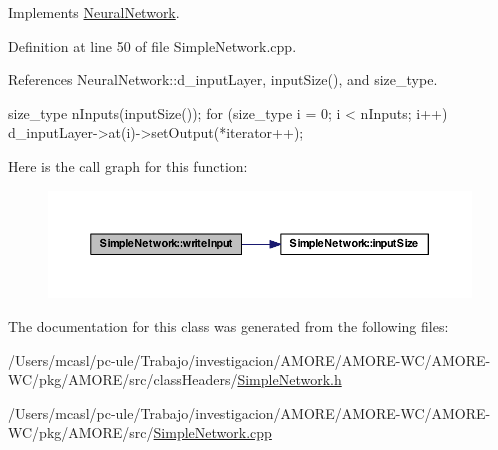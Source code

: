 Implements \hyperlink{class_neural_network_ad84eb675d31eab6e5d45c37f686d8186}{NeuralNetwork}.



Definition at line 50 of file SimpleNetwork.cpp.



References NeuralNetwork::d\_\-inputLayer, inputSize(), and size\_\-type.


\begin{DoxyCode}
{
  size_type nInputs(inputSize());
  for (size_type i = 0; i < nInputs; i++)
    {
      d_inputLayer->at(i)->setOutput(*iterator++);
    }
}
\end{DoxyCode}


Here is the call graph for this function:
\nopagebreak
\begin{figure}[H]
\begin{center}
\leavevmode
\includegraphics[width=394pt]{class_simple_network_a45c0a090f4ac14963c7f2ebfc4cc3f5d_cgraph}
\end{center}
\end{figure}




The documentation for this class was generated from the following files:\begin{DoxyCompactItemize}
\item 
/Users/mcasl/pc-\/ule/Trabajo/investigacion/AMORE/AMORE-\/WC/AMORE-\/WC/pkg/AMORE/src/classHeaders/\hyperlink{_simple_network_8h}{SimpleNetwork.h}\item 
/Users/mcasl/pc-\/ule/Trabajo/investigacion/AMORE/AMORE-\/WC/AMORE-\/WC/pkg/AMORE/src/\hyperlink{_simple_network_8cpp}{SimpleNetwork.cpp}\end{DoxyCompactItemize}
